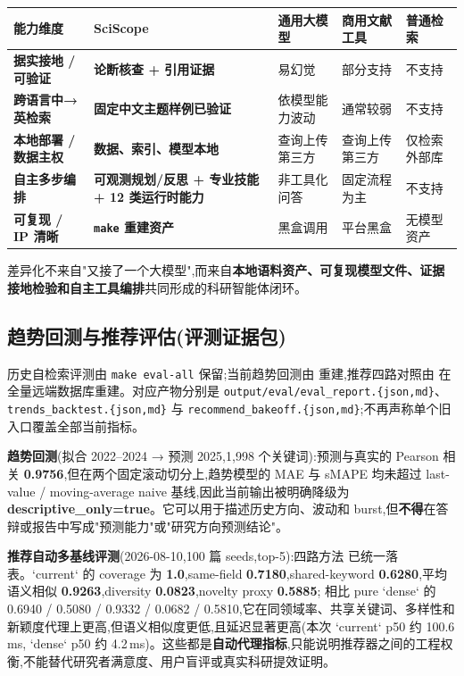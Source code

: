 \begin{tableblock}
\begin{tabularx}{0.96\textwidth}{>{\bfseries}p{34mm}XXXX}
\toprule
能力维度 & \textbf{SciScope} & 通用大模型 & 商用文献工具 & 普通检索 \\
\midrule
据实接地 / 可验证 & \textbf{论断核查 + 引用证据} & 易幻觉 & 部分支持 & 不支持 \\
跨语言中→英检索 & \textbf{固定中文主题样例已验证} & 依模型能力波动 & 通常较弱 & 不支持 \\
本地部署 / 数据主权 & \textbf{数据、索引、模型本地} & 查询上传第三方 & 查询上传第三方 & 仅检索外部库 \\
自主多步编排 & \textbf{可观测规划/反思 + 专业技能 + 12 类运行时能力} & 非工具化问答 & 固定流程为主 & 不支持 \\
可复现 / IP 清晰 & \textbf{\texttt{make} 重建资产} & 黑盒调用 & 平台黑盒 & 无模型资产 \\
\bottomrule
\end{tabularx}
\end{tableblock}
差异化不来自"又接了一个大模型",而来自\textbf{本地语料资产、可复现模型文件、证据接地检验和自主工具编排}共同形成的科研智能体闭环。

\subsection{趋势回测与推荐评估(评测证据包)}
历史自检索评测由 \texttt{make eval-all} 保留;当前趋势回测由
 重建,推荐四路对照由
 在全量远端数据库重建。对应产物分别是
\texttt{output/eval/eval\_report.\{json,md\}}、\texttt{trends\_backtest.\{json,md\}} 与
\texttt{recommend\_bakeoff.\{json,md\}};不再声称单个旧入口覆盖全部当前指标。

\textbf{趋势回测}(拟合 2022--2024 → 预测 2025,1{,}998 个关键词):预测与真实的 Pearson 相关 \textbf{0.9756},但在两个固定滚动切分上,趋势模型的 MAE 与 sMAPE 均未超过 last-value / moving-average naive 基线,因此当前输出被明确降级为 \textbf{descriptive\_only=true}。它可以用于描述历史方向、波动和 burst,但\textbf{不得}在答辩或报告中写成"预测能力"或"研究方向预测结论"。

\textbf{推荐自动多基线评测}(2026-08-10,100 篇 seeds,top-5):四路方法  已统一落表。`current` 的 coverage 为 \textbf{1.0},same-field \textbf{0.7180},shared-keyword \textbf{0.6280},平均语义相似 \textbf{0.9263},diversity \textbf{0.0823},novelty proxy \textbf{0.5885}; 相比 pure `dense` 的 0.6940 / 0.5080 / 0.9332 / 0.0682 / 0.5810,它在同领域率、共享关键词、多样性和新颖度代理上更高,但语义相似度更低,且延迟显著更高(本次 `current` p50 约 100.6\,ms, `dense` p50 约 4.2\,ms)。这些都是\textbf{自动代理指标},只能说明推荐器之间的工程权衡,不能替代研究者满意度、用户盲评或真实科研提效证明。

